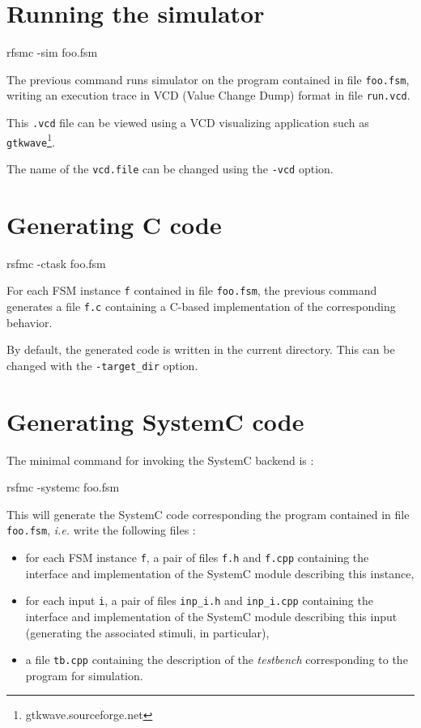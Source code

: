 \section{Running the simulator}
\label{sec:running-simulator}

\begin{FVerbatim}
rfsmc -sim foo.fsm  
\end{FVerbatim}

The previous command runs simulator on the program contained in file \texttt{foo.fsm}, writing
an execution trace in VCD (Value Change Dump) format in file \verb|run.vcd|.

This \verb|.vcd| file can be viewed using a VCD visualizing application such as
\verb|gtkwave|\footnote{gtkwave.sourceforge.net}.

The name of the \verb|vcd.file| can be changed using the \verb|-vcd| option.

\section{Generating C code}
\label{sec:gener-c-code}

\begin{FVerbatim}
rsfmc -ctask foo.fsm  
\end{FVerbatim}

For each FSM instance \verb|f| contained in file \verb|foo.fsm|, the previous command generates a file
\verb|f.c| containing a C-based implementation of the corresponding behavior.

By default, the generated code is written in the current directory. This can be changed with the
\verb|-target_dir| option.

\section{Generating SystemC code}
\label{sec:gener-syst-code}

The minimal command for invoking the SystemC backend is :

\begin{FVerbatim}
rsfmc -systemc foo.fsm  
\end{FVerbatim}

This will  generate the SystemC code corresponding the program contained in file
\texttt{foo.fsm}, \emph{i.e.} write the following files :
\begin{itemize}
\item for each FSM instance \verb|f|, a pair of files \verb|f.h| and \verb|f.cpp| containing the
  interface and implementation of the SystemC module describing this instance,
\item for each input \verb|i|, a pair of files \verb|inp_i.h| and \verb|inp_i.cpp| containing the
  interface and implementation of the SystemC module describing this input (generating the
  associated stimuli, in particular),
\item a file \verb|tb.cpp| containing the description of the \emph{testbench} corresponding to the
  program for simulation.
\end{itemize}

